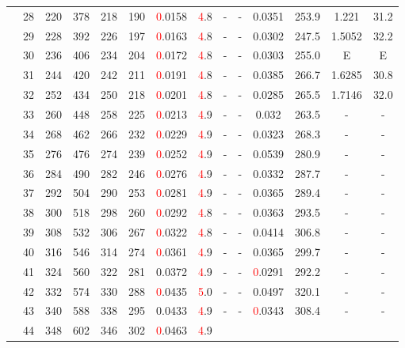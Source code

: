 \begin{table}[htb]
{\begin{tabular}{|c|c|c|c|c|c|c|c|c|c|c|c|c|c|}
 & 
28 & 220 & 378 & 218 & 190
 & \textcolor{red}0.0158 & \textcolor{red}4.8
 & - & -
 & 0.0351 & 253.9
 & 1.221 & 31.2
 \\
 & 
29 & 228 & 392 & 226 & 197
 & \textcolor{red}0.0163 & \textcolor{red}4.8
 & - & -
 & 0.0302 & 247.5
 & 1.5052 & 32.2
 \\
 & 
30 & 236 & 406 & 234 & 204
 & \textcolor{red}0.0172 & \textcolor{red}4.8
 & - & -
 & 0.0303 & 255.0
 & E & E
 \\
 & 
31 & 244 & 420 & 242 & 211
 & \textcolor{red}0.0191 & \textcolor{red}4.8
 & - & -
 & 0.0385 & 266.7
 & 1.6285 & 30.8
 \\
 & 
32 & 252 & 434 & 250 & 218
 & \textcolor{red}0.0201 & \textcolor{red}4.8
 & - & -
 & 0.0285 & 265.5
 & 1.7146 & 32.0
 \\
 & 
33 & 260 & 448 & 258 & 225
 & \textcolor{red}0.0213 & \textcolor{red}4.9
 & - & -
 & 0.032 & 263.5
 & - & -
 \\
 & 
34 & 268 & 462 & 266 & 232
 & \textcolor{red}0.0229 & \textcolor{red}4.9
 & - & -
 & 0.0323 & 268.3
 & - & -
 \\
 & 
35 & 276 & 476 & 274 & 239
 & \textcolor{red}0.0252 & \textcolor{red}4.9
 & - & -
 & 0.0539 & 280.9
 & - & -
 \\
 & 
36 & 284 & 490 & 282 & 246
 & \textcolor{red}0.0276 & \textcolor{red}4.9
 & - & -
 & 0.0332 & 287.7
 & - & -
 \\
 & 
37 & 292 & 504 & 290 & 253
 & \textcolor{red}0.0281 & \textcolor{red}4.9
 & - & -
 & 0.0365 & 289.4
 & - & -
 \\
 & 
38 & 300 & 518 & 298 & 260
 & \textcolor{red}0.0292 & \textcolor{red}4.8
 & - & -
 & 0.0363 & 293.5
 & - & -
 \\
 & 
39 & 308 & 532 & 306 & 267
 & \textcolor{red}0.0322 & \textcolor{red}4.8
 & - & -
 & 0.0414 & 306.8
 & - & -
 \\
 & 
40 & 316 & 546 & 314 & 274
 & \textcolor{red}0.0361 & \textcolor{red}4.9
 & - & -
 & 0.0365 & 299.7
 & - & -
 \\
 & 
41 & 324 & 560 & 322 & 281
 & 0.0372 & \textcolor{red}4.9
 & - & -
 & \textcolor{red}0.0291 & 292.2
 & - & -
 \\
 & 
42 & 332 & 574 & 330 & 288
 & \textcolor{red}0.0435 & \textcolor{red}5.0
 & - & -
 & 0.0497 & 320.1
 & - & -
 \\
 & 
43 & 340 & 588 & 338 & 295
 & 0.0433 & \textcolor{red}4.9
 & - & -
 & \textcolor{red}0.0343 & 308.4
 & - & -
 \\
 & 
44 & 348 & 602 & 346 & 302
 & \textcolor{red}0.0463 & \textcolor{red}4.9

\end{tabular}}
\end{table}
